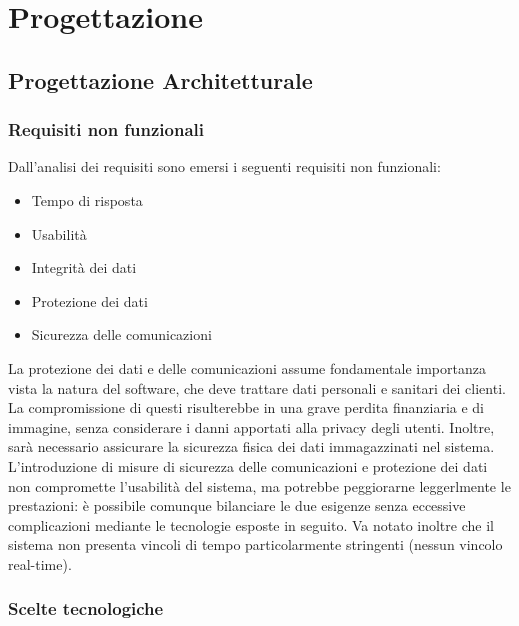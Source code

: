 \newpage
\section{Progettazione}

\subsection{Progettazione Architetturale}

\subsubsection{Requisiti non funzionali}

Dall'analisi dei requisiti sono emersi i seguenti requisiti non funzionali:
\begin{itemize}
\item Tempo di risposta
\item Usabilità
\item Integrità dei dati
\item Protezione dei dati 
\item Sicurezza delle comunicazioni
\end{itemize}
La protezione dei dati e delle comunicazioni assume fondamentale importanza vista la natura del software, 
che deve trattare dati personali e sanitari dei clienti. 
La compromissione di questi risulterebbe in una grave perdita finanziaria e di immagine, senza considerare i danni apportati alla privacy degli utenti. 
Inoltre, sarà necessario assicurare la sicurezza fisica dei dati immagazzinati nel sistema.
L'introduzione di misure di sicurezza delle comunicazioni e protezione dei dati non compromette l'usabilità del sistema, ma potrebbe peggiorarne leggerlmente le prestazioni: 
è possibile comunque bilanciare le due esigenze senza eccessive complicazioni mediante le tecnologie esposte in seguito. 
Va notato inoltre che il sistema non presenta vincoli di tempo particolarmente stringenti (nessun vincolo real-time).

\subsubsection{Scelte tecnologiche}

